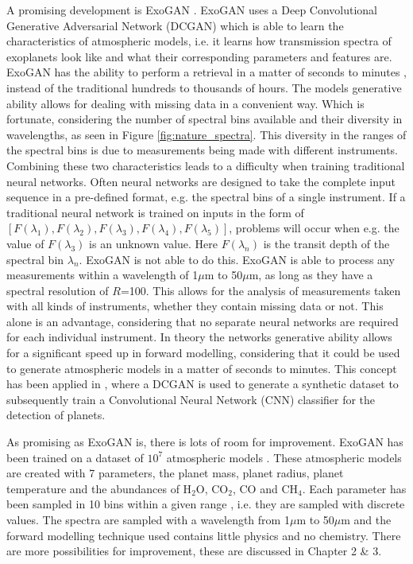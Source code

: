 A promising development is ExoGAN \cite{zingales2018exogan}. ExoGAN uses a Deep Convolutional Generative Adversarial Network (DCGAN) which is able to learn the characteristics of atmospheric models, i.e. it learns how transmission spectra of exoplanets look like and what their corresponding parameters and features are. ExoGAN has the ability to perform a retrieval in a matter of seconds to minutes \cite{zingales2018exogan}, instead of the traditional hundreds to thousands of hours. The models generative ability allows for dealing with missing data in a convenient way. Which is fortunate, considering the number of spectral bins available and their diversity in wavelengths, as seen in Figure \ref{fig:nature_spectra}. This diversity in the ranges of the spectral bins is due to measurements being made with different instruments. Combining these two characteristics leads to a difficulty when training traditional neural networks. Often neural networks are designed to take the complete input sequence in a pre-defined format, e.g. the spectral bins of a single instrument. If a traditional neural network is trained on inputs in the form of $[F(\lambda_1),F(\lambda_2),F(\lambda_3),F(\lambda_4),F(\lambda_5)]$, problems will occur when e.g. the value of $F(\lambda_3)$ is an unknown value. Here $F(\lambda_n)$ is the transit depth of the spectral bin $\lambda_n$. ExoGAN is not able to do this. ExoGAN is able to process any measurements within a wavelength of 1$\mu$m to 50$\mu$m, as long as they have a spectral resolution of $R$=100. This allows for the analysis of measurements taken with all kinds of instruments, whether they contain missing data or not. This alone is an advantage, considering that no separate neural networks are required for each individual instrument.
In theory the networks generative ability allows for a significant speed up in forward modelling, considering that it could be used to generate atmospheric models in a matter of seconds to minutes. This concept has been applied in \cite{yip2019pushing}, where a DCGAN is used to generate a synthetic dataset to subsequently train a Convolutional Neural Network (CNN) classifier for the detection of planets.

As promising as ExoGAN is, there is lots of room for improvement. ExoGAN has been trained on a dataset of $10^7$ atmospheric models \cite{zingales2018exogan}. These atmospheric models are created with 7 parameters, the planet mass, planet radius, planet temperature and the abundances of H$_2$O, CO$_2$, CO and CH$_4$. Each parameter has been sampled in 10 bins within a given range \cite{zingales2018exogan}, i.e. they are sampled with discrete values. The spectra are sampled with a wavelength from 1$\mu$m to 50$\mu$m and the forward modelling technique used contains little physics and no chemistry. There are more possibilities for improvement, these are discussed in Chapter 2 \& 3.

